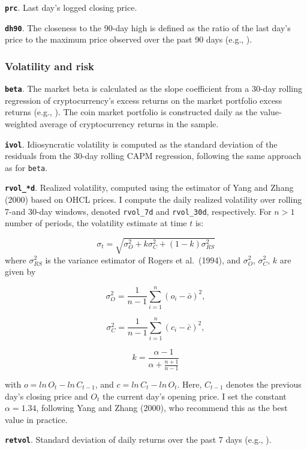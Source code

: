 \documentclass[
  12pt,
  a4paper,
  openany]{scrbook}
\begin{document}
\textbf{\texttt{prc}}. Last day's logged closing price.

\textbf{\texttt{dh90}}. The closeness to the 90-day high is defined as
the ratio of the last day's price to the maximum price observed over the
past 90 days (e.g., ).

\subsubsection{Volatility and risk}\label{volatility-and-risk}

\textbf{\texttt{beta}}. The market beta is calculated as the slope
coefficient from a 30-day rolling regression of cryptocurrency's excess
returns on the market portfolio excess returns (e.g.,
).
The coin market portfolio is constructed daily as the value-weighted
average of cryptocurrency returns in the sample.

\textbf{\texttt{ivol}}. Idiosyncratic volatility is computed as the
standard deviation of the residuals from the 30-day rolling CAPM
regression, following the same approach as for \texttt{beta}.

\textbf{\texttt{rvol\_*d}}. Realized volatility, computed using the
estimator of Yang and Zhang (2000) based on OHCL prices. I compute the
daily realized volatility over rolling 7-and 30-day windows, denoted
\texttt{rvol\_7d} and \texttt{rvol\_30d}, respectively. For \(n > 1\)
number of periods, the volatility estimate at time \(t\) is:

\[
\sigma_t = \sqrt{\sigma^2_O + k\sigma^2_C + (1 - k)\sigma^2_{RS}}
\] where \(\sigma^2_{RS}\) is the variance estimator of Rogers et
al.~(1994), and \(\sigma^2_O\), \(\sigma^2_C\), \(k\) are given by

\[
\sigma^2_O = \frac{1}{n-1}\sum\limits_{i=1}^n(o_i - \bar o)^2,
\]

\[
\sigma^2_C = \frac{1}{n-1}\sum\limits_{i=1}^n(c_i - \bar c)^2,
\]

\[
k = \frac{\alpha -1}{\alpha + \frac{n+1}{n-1}}
\]

with \(o = ln\,O_t - ln\,C_{t-1}\), and \(c = ln\,C_t - ln\,O_t\). Here,
\(C_{t-1}\) denotes the previous day's closing price and \(O_t\) the
current day's opening price. I set the constant \(\alpha = 1.34\),
following Yang and Zhang (2000), who recommend this as the best value in
practice.

\textbf{\texttt{retvol}}. Standard deviation of daily returns over the
past 7 days (e.g., ).
\end{document}
